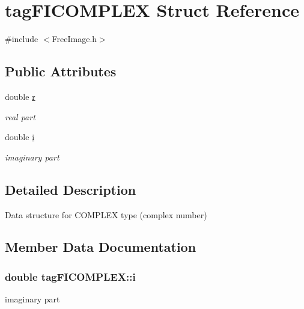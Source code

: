 \hypertarget{structtag_f_i_c_o_m_p_l_e_x}{\section{tag\-F\-I\-C\-O\-M\-P\-L\-E\-X Struct Reference}
\label{structtag_f_i_c_o_m_p_l_e_x}
}


{\ttfamily \#include $<$Free\-Image.\-h$>$}

\subsection*{Public Attributes}
\begin{DoxyCompactItemize}
\item 
double \hyperlink{structtag_f_i_c_o_m_p_l_e_x_a448818f3de56c81064bdcb1ba78a7ead}{r}
\begin{DoxyCompactList}\small\item\em real part \end{DoxyCompactList}\item 
double \hyperlink{structtag_f_i_c_o_m_p_l_e_x_ad2cc2cc6d32c1e5496f2c77e185d8218}{i}
\begin{DoxyCompactList}\small\item\em imaginary part \end{DoxyCompactList}\end{DoxyCompactItemize}


\subsection{Detailed Description}
Data structure for C\-O\-M\-P\-L\-E\-X type (complex number) 

\subsection{Member Data Documentation}
\hypertarget{structtag_f_i_c_o_m_p_l_e_x_ad2cc2cc6d32c1e5496f2c77e185d8218}{
\subsubsection[{i}]{\setlength{\rightskip}{0pt plus 5cm}double tag\-F\-I\-C\-O\-M\-P\-L\-E\-X\-::i}}\label{structtag_f_i_c_o_m_p_l_e_x_ad2cc2cc6d32c1e5496f2c77e185d8218}


imaginary part 


